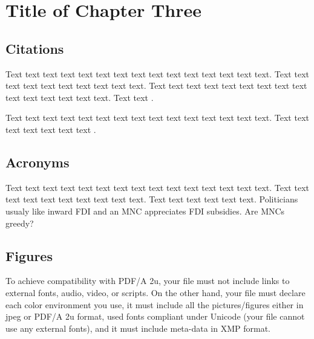 \chapter{Title of Chapter Three}
\label{chap:three}

\section{Citations}
\label{sec:citace}

Text text text text text text text text text text text text text text text. Text text text text text text text text text text. Text text text text text text text text text text text text text text text. Text text  \citet{Haufler2006}.

Text text text text text text text text text text text text text text text. Text text text text text text text \cite[see, ,][pg.~10]{Haaparanta1996}. 

\section{Acronyms}

Text text text text text text text text text text text text text text text. Text text text text text text text text text text. Text text text text text text. Politicians usualy like inward \ac{FDI} and an \ac{MNC} appreciates \ac{FDI} subsidies. Are \acp{MNC} greedy?

\section{Figures}

To achieve compatibility with PDF/A 2u, your file must not include links to external fonts, audio, video, or scripts. On the other hand, your file must declare each color environment you use, it must include all the pictures/figures either in jpeg or PDF/A 2u format, used fonts compliant under Unicode (your file cannot use any external fonts), and it must include meta-data in XMP format.


